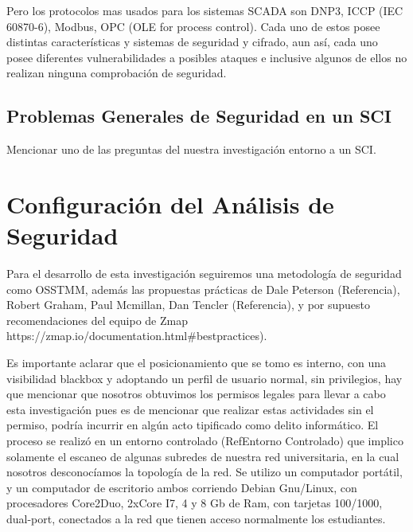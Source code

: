 \documentclass[jou,apacite]{apa6}   %
\begin{document}
Pero los protocolos mas usados para los sistemas SCADA son DNP3, ICCP (IEC 60870-6), Modbus, OPC (OLE for process control). Cada uno de estos posee distintas características y sistemas de seguridad y cifrado, aun así, cada uno posee diferentes vulnerabilidades a posibles ataques e inclusive algunos de ellos no realizan ninguna comprobación de seguridad.

\subsection{Problemas Generales de Seguridad en un SCI }
Mencionar uno de las preguntas del nuestra investigación entorno a un SCI.

\section{Configuración del Análisis de Seguridad}
Para el desarrollo de esta investigación seguiremos una metodología de seguridad como OSSTMM, además las propuestas prácticas de  Dale Peterson (Referencia),   Robert Graham, Paul Mcmillan, Dan Tencler (Referencia), y por supuesto recomendaciones del equipo de Zmap https://zmap.io/documentation.html\#bestpractices).

Es importante aclarar que el posicionamiento que se tomo es  interno, con una visibilidad blackbox y adoptando un perfil de  usuario normal, sin privilegios, hay que mencionar que nosotros obtuvimos los permisos legales para  llevar a cabo esta investigación pues es de mencionar que realizar estas actividades sin el permiso,  podría incurrir en algún acto tipificado como delito informático. El proceso se realizó en un entorno controlado (RefEntorno Controlado) que implico solamente el escaneo de  algunas subredes de nuestra red universitaria, en la cual  nosotros desconocíamos la topología de la red. Se utilizo un computador portátil, y un computador de escritorio ambos corriendo Debian Gnu/Linux, con procesadores Core2Duo, 2xCore I7,  4 y 8 Gb  de Ram, con tarjetas 100/1000, dual-port, conectados a la red que tienen acceso normalmente los estudiantes.
\end{document}

